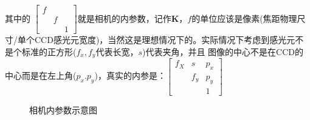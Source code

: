 \documentclass[12pt]{article}
\begin{document}
其中的
$\left[\begin{array}{lll}
    f &  & \\
      & f &\\
      &   & 1
\end{array}\right]$就是相机的内参数，记作$\mathbf{K}$，$f$的单位应该是像素(焦距物理尺寸/单个CCD感光元宽度)，当然这是理想情况下的。实际情况下考虑到感光元不是个标准的正方形($f_x, f_y$代表长宽，$s$)代表夹角，并且
图像的中心不是在CCD的中心而是在左上角($p_x. p_y$)，真实的内参是：$\left[\begin{array}{lll}
    f_X & s  & p_x \\
      & f_y & p_y\\
      &   & 1
\end{array}\right]$

\begin{figure}[ht]
    \centering
    \caption{相机内参数示意图}
    \label{fig:nc}
\end{figure}
\end{document}
